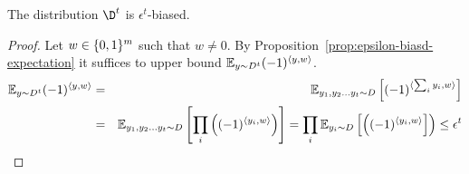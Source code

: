 \begin{claim}
\label{lem:bias-amplification}
The distribution $\D^t$ is $\epsilon^t$-biased.
\end{claim}
\begin{proof}
Let $w \in \{0,1\}^m$ such that $w \ne 0$. By Proposition~\ref{prop:epsilon-biasd-expectation} it suffices to upper bound ${\mathbb E}_{y \sim D^t} (-1)^{\langle y,w \rangle}$.
\begin{eqnarray*}
{\mathbb E}_{y \sim D^t} (-1)^{\langle y,w \rangle} & = & {\mathbb E}_{y_1, y_2 \ldots y_t \sim D} \left[ (-1)^{\langle \sum_i y_i,w  \rangle} \right] \\
& = & {\mathbb E}_{y_1, y_2 \ldots y_t \sim D} \left[ \prod_i \left((-1)^{\langle y_i,w  \rangle} \right) \right] = \prod_i {\mathbb E}_{y_i \sim D} \left[ \left((-1)^{\langle y_i,w  \rangle} \right] \right) \le \epsilon^t
\end{eqnarray*}
\end{proof}

